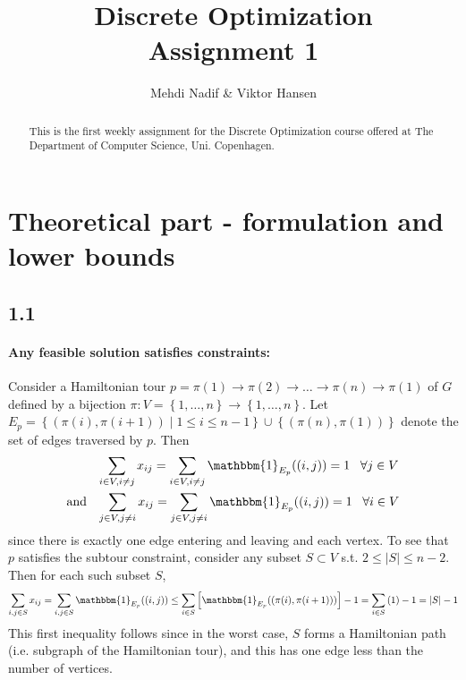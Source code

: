 \documentclass[12pt]{article}
\begin{document}
\nocite{*}


\title{Discrete Optimization \\
       Assignment 1}

\author{Mehdi Nadif \& Viktor Hansen}

\maketitle

\begin{abstract}
  This is the first weekly assignment for the Discrete Optimization course offered at The Department of Computer Science, Uni. Copenhagen.
\end{abstract}

\pagebreak

\section*{Theoretical part - formulation and lower bounds}
\subsection*{1.1}
\paragraph{Any feasible solution satisfies constraints:} Consider a Hamiltonian tour $p = \pi(1) \rightarrow \pi(2) \rightarrow \hdots \rightarrow \pi(n) \rightarrow \pi(1)$ of $G$ defined by a bijection $\pi : V=\left\{ 1, \hdots, n \right\} \rightarrow \left\{ 1, \hdots, n \right\}$. Let $E_p = \left\{ \left(\pi(i),\pi(i+1) \right) \; | \; 1 \leq i \leq n-1 \right\} \cup \left\{ \left(\pi(n),\pi(1) \right) \right\}$ denote the set of edges traversed by $p$. Then
\begin{align*}
&\sum_{i \in V, i \neq j} x_{ij} = \sum_{i \in V, i \neq j} \mathbbm{1}_{E_p}((i,j)) = 1 \; \; \; \forall j \in V \\
\mathrm{and} \; \; \;  &\sum_{j \in V, j \neq i} x_{ij} = \sum_{j \in V, j \neq i} \mathbbm{1}_{E_p}((i,j)) = 1 \; \; \; \forall i \in V
\end{align*}
since there is exactly one edge entering and leaving and each vertex. To see that $p$ satisfies the subtour constraint, consider any subset $S \subset V$ s.t. $2 \leq |S| \leq n-2$. Then for each such subset $S$,
\begin{align*}
\sum_{i,j \in S} x_{ij} = \sum_{i,j \in S} \mathbbm{1}_{E_p}((i,j)) \leq \sum_{i \in S} \left[ \mathbbm{1}_{E_p}((\pi(i),\pi(i+1))) \right] - 1 = \sum_{i \in S} \left( 1 \right) - 1 = |S| - 1
\end{align*}
This first inequality follows since in the worst case, $S$ forms a Hamiltonian path (i.e. subgraph of the Hamiltonian tour), and this has one edge less than the number of vertices.
\end{document}
